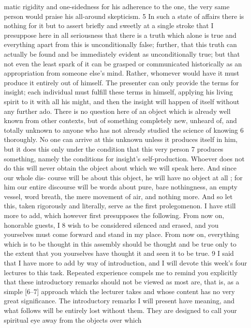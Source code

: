 matic rigidity and one-sidedness for his adherence to the one, the very same
person would praise his all-around skepticism. 5
In such a state of affairs there is nothing for it but to assert briefly and
sweetly at a single stroke that I presuppose here in all seriousness that there is
a truth which alone is true and everything apart from this is unconditionally
false; further, that this truth can actually be found and be immediately evident
as unconditionally true; but that not even the least spark of it can be grasped
or communicated historically as an appropriation from someone else’s mind.
Rather, whomever would have it must produce it entirely out of himself. The
presenter can only provide the terms for insight; each individual must fulfill
these terms in himself, applying his living spirit to it with all his might, and
then the insight will happen of itself without any further ado. There is no
question here of an object which is already well known from other contexts,
but of something completely new, unheard of, and totally unknown to anyone
who has not already studied the science of knowing 6 thoroughly. No one can
arrive at this unknown unless it produces itself in him, but it does this only
under the condition that this very person 7 produces something, namely the
conditions for insight’s self-production. Whoever does not do this will never
obtain the object about which we will speak here. And since our whole dis-
course will be about this object, he will have no object at all ; for him our entire
discourse will be words about pure, bare nothingness, an empty vessel, word
breath, the mere movement of air, and nothing more. And so let this, taken
rigorously and literally, serve as the first prolegomenon.
I have still more to add, which however first presupposes the following.
From now on, honorable guests, I 8 wish to be considered silenced and erased,
and you yourselves must come forward and stand in my place. From now on,
everything which is to be thought in this assembly should be thought and be
true only to the extent that you yourselves have thought it and seen it to be true. 9
I said that I have more to add by way of introduction, and I will devote
this week’s four lectures to this task. Repeated experience compels me to
remind you explicitly that these introductory remarks should not be viewed as
most are, that is, as a simple [6–7] approach which the lecturer takes and
whose content has no very great significance. The introductory remarks I will
present have meaning, and what follows will be entirely lost without them.
They are designed to call your spiritual eye away from the objects over which
